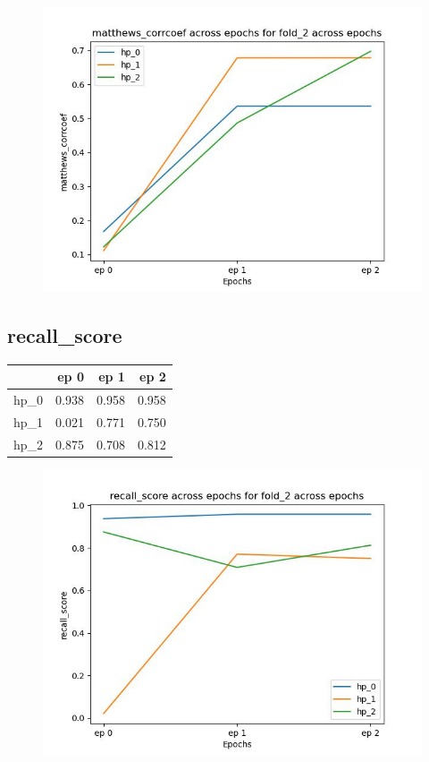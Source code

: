 \documentclass{article}
\begin{document}
\begin{figure}[H]
\includegraphics[scale = 0.75]{fold_2/matthews_corrcoef}
\end{figure}
\subsection{recall\_score}
\begin{tabular}{lrrr}
\toprule
{} &   ep 0 &   ep 1 &   ep 2 \\
\midrule
hp\_0 &  0.938 &  0.958 &  0.958 \\
hp\_1 &  0.021 &  0.771 &  0.750 \\
hp\_2 &  0.875 &  0.708 &  0.812 \\
\bottomrule
\end{tabular}

\begin{figure}[H]
\includegraphics[scale = 0.75]{fold_2/recall_score}
\end{figure}
\end{document}
